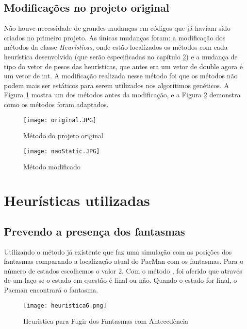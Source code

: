 \documentclass[12pt, a4paper, english, brazil]{abntex2}
\begin{document}
\section{Modificações no projeto original}
Não houve necessidade de grandes mudanças em códigos que já haviam sido criados no primeiro projeto.  As únicas mudanças foram: a modificação dos métodos da classe \textit{Heuristicas}, onde estão localizados os métodos com cada heurística desenvolvida (que serão especificadas no capítulo \ref{chapter:heuristicas}) e a mudança de tipo do vetor de pesos das heurísticas, que antes era um vetor de double agora é um vetor de int. A modificação realizada nesse método foi que os métodos não podem mais ser estáticos para serem utilizados nos algorítimos genéticos. A Figura \ref{fig:original} mostra um dos métodos antes da modificação, e a Figura \ref{fig:naoStatic} demonstra como os métodos foram adaptados.

\begin{figure}[H]
\centering
\texttt{[image: original.JPG]}
\caption{Método do projeto original}
\label{fig:original}
\end{figure}

\begin{figure}[H]
\centering
\texttt{[image: naoStatic.JPG]}
\caption{Método modificado}
\label{fig:naoStatic}
\end{figure}

\chapter{Heurísticas utilizadas}
\label{chapter:heuristicas}


    \section{Prevendo a presença dos fantasmas}
    Utilizando o método já existente  que faz uma simulação com as posições dos fantasmas comparando a localização atual do PacMan com os fantasmas. Para o número de estados escolhemos o valor 2. Com o método , foi aferido que através de um laço se o estado em questão é final ou não. Quando o estado for final, o Pacman encontrará o fantasma. 

\begin{figure}[H]
\centering
\caption{Heuristica para Fugir dos Fantasmas com Antecedência}
\texttt{[image: heuristica6.png]}
\label{fig:heuristica6}
\end{figure}   
\end{document}
